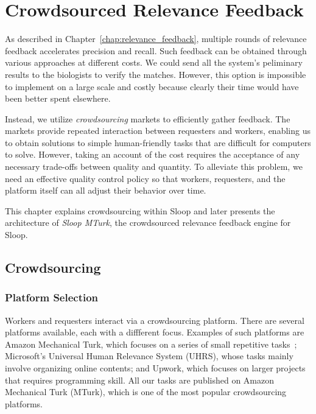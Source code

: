 \graphicspath{{./images/chap5/}}
\chapter{Crowdsourced Relevance Feedback}
\label{chap:sloop_mturk}

As described in Chapter~\ref{chap:relevance_feedback}, multiple rounds of
relevance feedback accelerates precision and recall. Such feedback can be 
obtained through various approaches at different costs. We could send all
the system's peliminary results to the biologists to verify the matches.
However, this option is impossible to implement on a large scale and costly
because clearly their time would have been better spent elsewhere.

Instead, we utilize \emph{crowdsourcing} markets to efficiently gather
feedback. The markets provide repeated interaction between requesters and
workers, enabling us to obtain solutions to simple human-friendly tasks that
are difficult for computers to solve. However, taking an account of the cost
requires the acceptance of any necessary trade-offs between quality and
quantity. To alleviate this problem, we need an
effective quality control policy so that workers, requesters, and the platform
itself can all adjust their behavior over time. 

This chapter explains crowdsourcing within Sloop and later presents the
architecture of \emph{Sloop MTurk}, the crowdsourced relevance feedback engine
for Sloop.

\section{Crowdsourcing} %
\label{sec:crowdsourcing}

  \subsection{Platform Selection}

  Workers and requesters interact via a crowdsourcing platform. There are several 
  platforms available, each with a diffferent focus. Examples of such
  platforms are 
  Amazon Mechanical Turk, which focuses on a series of small repetitive
  tasks~\cite{sliv14}; Microsoft's Universal Human Relevance System (UHRS),
  whose tasks mainly involve organizing online contents;
  and Upwork, which focuses on larger projects that requires programming skill.
  All our tasks are published on Amazon Mechanical Turk (MTurk), which is one of the most
  popular crowdsourcing platforms.


